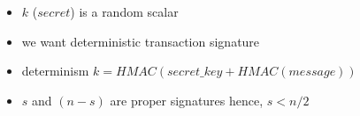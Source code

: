 \begin{itemize}
    \item $k$ ($secret$) is a random scalar
    \item we want deterministic transaction signature
    \item determinism $k = HMAC(secret\_key + HMAC(message))$
    \item $s$ and $(n-s)$ are proper signatures hence, $s < n/2$
\end{itemize}
